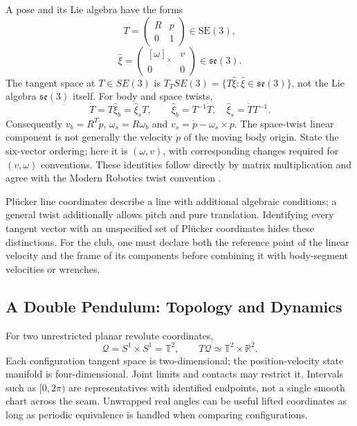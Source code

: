 A pose and its Lie algebra have the forms
\begin{equation}
T=\begin{pmatrix}R&p\\0&1\end{pmatrix}\in\mathrm{SE}(3),
\label{eq:ch1:SE3-def}
\end{equation}
\begin{equation}
\widehat\xi=\begin{pmatrix}[\omega]_\times&v\\0&0\end{pmatrix}\in\mathfrak{se}(3).
\label{eq:ch1:se3-tangent}
\end{equation}
The tangent space at $T\in SE(3)$ is $T_T SE(3)=\{T\hat\xi:\hat\xi\in\mathfrak{se}(3)\}$, not the Lie algebra $\mathfrak{se}(3)$ itself.
For body and space twists,
\begin{equation}
\dot T=T\widehat\xi_b=\widehat\xi_sT,\qquad
\widehat\xi_b=T^{-1}\dot T,\quad\widehat\xi_s=\dot TT^{-1}.
\label{eq:ch1:SE3-kinematics}
\end{equation}
Consequently $v_b=R^T\dot p$, $\omega_s=R\omega_b$ and
$v_s=\dot p-\omega_s\times p$. The space-twist linear component is not generally the
velocity $\dot p$ of the moving body origin. State the six-vector ordering; here it is
$(\omega,v)$, with corresponding changes required for $(v,\omega)$ conventions.
These identities follow directly by matrix multiplication and agree with the
Modern Robotics twist convention \cite{ModernRoboticsTwistsFoundations}.

Plücker line coordinates describe a line with additional algebraic conditions; a general
twist additionally allows pitch and pure translation. Identifying every tangent vector
with an unspecified set of Plücker coordinates hides these distinctions. For the club,
one must declare both the reference point of the linear velocity and the frame of its
components before combining it with body-segment velocities or wrenches.

\subsection{A Double Pendulum: Topology and Dynamics}

For two unrestricted planar revolute coordinates,
\begin{equation}
\mathcal Q=S^1\times S^1=\mathbb T^2,\qquad
T\mathcal Q\simeq\mathbb T^2\times\mathbb R^2.
\label{eq:ch1:double-pend-manifold}
\end{equation}
Each configuration tangent space is two-dimensional; the position-velocity state manifold
is four-dimensional. Joint limits and contacts may restrict it. Intervals such as
$[0,2\pi)$ are representatives with identified endpoints, not a single smooth chart
across the seam. Unwrapped real angles can be useful lifted coordinates as long as
periodic equivalence is handled when comparing configurations.


